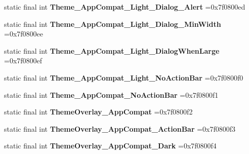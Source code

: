 \begin{DoxyCompactItemize}
\item 
\hypertarget{classcheck_1_1test_1_1_r_1_1style_a8f079048bdf912b45cbcba11ba59d8be}{}static final int {\bfseries Theme\+\_\+\+App\+Compat\+\_\+\+Light\+\_\+\+Dialog\+\_\+\+Alert} =0x7f0800ed\label{classcheck_1_1test_1_1_r_1_1style_a8f079048bdf912b45cbcba11ba59d8be}

\item 
\hypertarget{classcheck_1_1test_1_1_r_1_1style_a525f7aad5c1a953d96579a79820abb56}{}static final int {\bfseries Theme\+\_\+\+App\+Compat\+\_\+\+Light\+\_\+\+Dialog\+\_\+\+Min\+Width} =0x7f0800ee\label{classcheck_1_1test_1_1_r_1_1style_a525f7aad5c1a953d96579a79820abb56}

\item 
\hypertarget{classcheck_1_1test_1_1_r_1_1style_a0011a95122595346c48c4babda91d22a}{}static final int {\bfseries Theme\+\_\+\+App\+Compat\+\_\+\+Light\+\_\+\+Dialog\+When\+Large} =0x7f0800ef\label{classcheck_1_1test_1_1_r_1_1style_a0011a95122595346c48c4babda91d22a}

\item 
\hypertarget{classcheck_1_1test_1_1_r_1_1style_afe96c5ac5fddaf0bcc83362365077f2a}{}static final int {\bfseries Theme\+\_\+\+App\+Compat\+\_\+\+Light\+\_\+\+No\+Action\+Bar} =0x7f0800f0\label{classcheck_1_1test_1_1_r_1_1style_afe96c5ac5fddaf0bcc83362365077f2a}

\item 
\hypertarget{classcheck_1_1test_1_1_r_1_1style_a798f63833ef0aecd5c8bb04e59a64277}{}static final int {\bfseries Theme\+\_\+\+App\+Compat\+\_\+\+No\+Action\+Bar} =0x7f0800f1\label{classcheck_1_1test_1_1_r_1_1style_a798f63833ef0aecd5c8bb04e59a64277}

\item 
\hypertarget{classcheck_1_1test_1_1_r_1_1style_a58977104e446ce23a036b298689202f3}{}static final int {\bfseries Theme\+Overlay\+\_\+\+App\+Compat} =0x7f0800f2\label{classcheck_1_1test_1_1_r_1_1style_a58977104e446ce23a036b298689202f3}

\item 
\hypertarget{classcheck_1_1test_1_1_r_1_1style_abb7d1b75fb5cd63b9fdce7d663574f68}{}static final int {\bfseries Theme\+Overlay\+\_\+\+App\+Compat\+\_\+\+Action\+Bar} =0x7f0800f3\label{classcheck_1_1test_1_1_r_1_1style_abb7d1b75fb5cd63b9fdce7d663574f68}

\item 
\hypertarget{classcheck_1_1test_1_1_r_1_1style_ad13e01ae4e98dab3bf7d687a32dc0277}{}static final int {\bfseries Theme\+Overlay\+\_\+\+App\+Compat\+\_\+\+Dark} =0x7f0800f4\label{classcheck_1_1test_1_1_r_1_1style_ad13e01ae4e98dab3bf7d687a32dc0277}


\end{DoxyCompactItemize}
